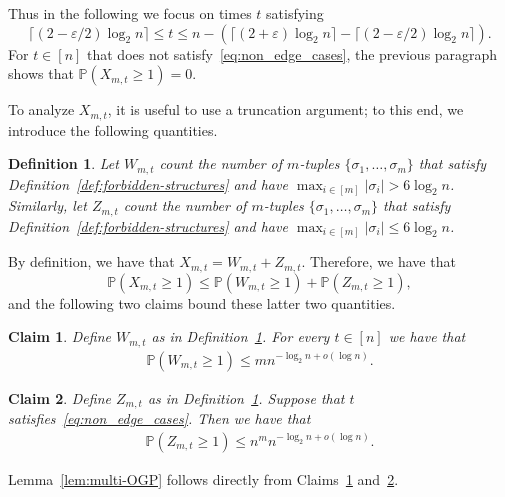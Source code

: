 \documentclass[11pt]{article}
\theoremstyle{plain}
\newtheorem{claim}{Claim}
\newtheorem{definition}{Definition}
\theoremstyle{definition}
\theoremstyle{remark}
\newcommand{\eps}{\varepsilon}
\renewcommand{\Pr}{\mathbb{P}}
\begin{document}
Thus in the following we focus on times $t$ satisfying 
\begin{equation}\label{eq:non_edge_cases}
\lceil (2 - \eps/2) \log_2 n\rceil 
\leq t 
\leq n - \left( \lceil (2 + \eps) \log_2 n\rceil - \lceil (2 - \eps/2) \log_2 n\rceil \right).
\end{equation}
For $t \in [n]$ that does not satisfy~\eqref{eq:non_edge_cases}, the previous paragraph shows that 
$\Pr \left( X_{m,t} \geq 1 \right) = 0$. 

To analyze $X_{m,t}$, it is useful to use a truncation argument; 
to this end, we introduce the following quantities.
\begin{definition}\label{def:WZ}
Let $W_{m,t}$ count the number of $m$-tuples $\{\sigma_1, \dots, \sigma_m\}$ that satisfy Definition~\ref{def:forbidden-structures} and have $\max_{i \in [m]} |\sigma_i| > 6 \log_2 n$. 
Similarly, let 
$Z_{m,t}$ count the number of $m$-tuples $\{\sigma_1, \dots, \sigma_m\}$ that satisfy Definition~\ref{def:forbidden-structures} and have $\max_{i \in [m]} |\sigma_i| \leq 6 \log_2 n$. 
\end{definition}
By definition, we have that 
$X_{m,t} = W_{m,t} + Z_{m,t}$. 
Therefore, we have that
\begin{equation}\label{eq:triangle_ineq}
\Pr\left( X_{m,t} \geq 1 \right) 
\leq \Pr \left( W_{m,t} \geq 1 \right)  + \Pr \left( Z_{m,t} \geq 1 \right),
\end{equation}
and the following two claims bound these latter two quantities. 


\begin{claim}\label{clm:big-tuples}
    Define $W_{m,t}$ as in Definition~\ref{def:WZ}. For every $t \in [n]$ we have that 
    \begin{align*}
        \Pr(W_{m,t} \geq 1) \leq m n^{-\log_2 n + o(\log n)}.
    \end{align*}
\end{claim}

\begin{claim}\label{clm:small-tuples}
    Define $Z_{m,t}$ as in Definition~\ref{def:WZ}. Suppose that $t$ satisfies~\eqref{eq:non_edge_cases}. Then we have that 
    \begin{align*}
        \Pr(Z_{m,t} \geq 1) \leq n^m n^{-\log_2 n + o(\log n)}.
    \end{align*}
\end{claim}

Lemma~\ref{lem:multi-OGP} follows directly from Claims~\ref{clm:big-tuples} and~\ref{clm:small-tuples}. 
\end{document}
